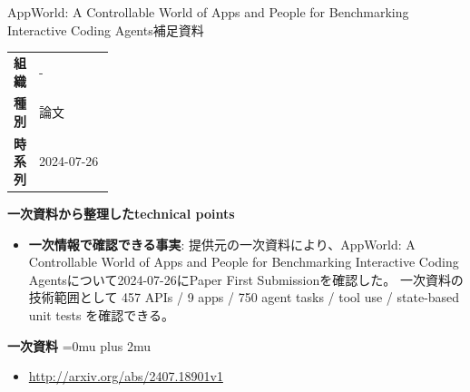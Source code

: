 \begin{technicalnote}{AppWorld: A Controllable World of Apps and People for Benchmarking Interactive Coding Agents}{補足資料}
\begingroup
\begin{tabularx}{\linewidth}{@{}>{\bfseries}p{0.22\linewidth}X@{}}
組織 & - \\
種別 & 論文 \\
時系列 & 2024-07-26 \\
\end{tabularx}
\smallskip
{\bfseries 一次資料から整理したtechnical points}
\begin{itemize}[leftmargin=1.5em,itemsep=0.35em]
\item \textbf{一次情報で確認できる事実}: 提供元の一次資料により、AppWorld: A Controllable World of Apps and People for Benchmarking Interactive Coding Agentsについて2024-07-26にPaper First Submissionを確認した。 一次資料の技術範囲として 457 APIs / 9 apps / 750 agent tasks / tool use / state-based unit tests を確認できる。
\end{itemize}
\begin{minipage}{\linewidth}
\begin{samepage}
{\bfseries 一次資料}
\begingroup\sloppy
\Urlmuskip=0mu plus 2mu\relax
\begin{itemize}[leftmargin=1.5em,itemsep=0.25em]
\item {\scriptsize\url{http://arxiv.org/abs/2407.18901v1}}
\end{itemize}
\endgroup
\end{samepage}
\end{minipage}
\endgroup
\end{technicalnote}
\medskip

